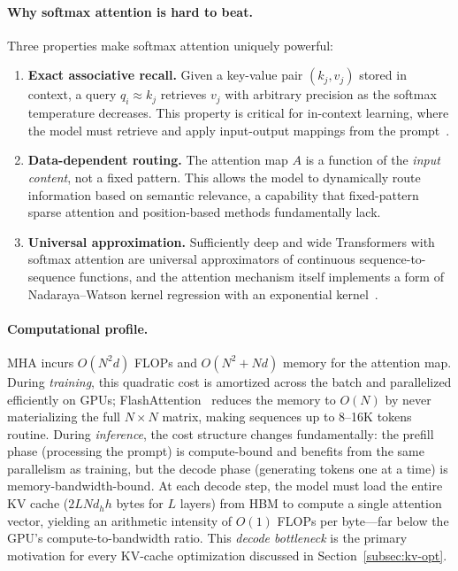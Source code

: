 \documentclass[11pt,a4paper]{article}
\begin{document}
\paragraph{Why softmax attention is hard to beat.}
Three properties make softmax attention uniquely powerful:
\begin{enumerate}
\item \textbf{Exact associative recall.} Given a key-value pair $(k_j, v_j)$ stored in context, a query $q_i \approx k_j$ retrieves $v_j$ with arbitrary precision as the softmax temperature decreases. This property is critical for in-context learning, where the model must retrieve and apply input-output mappings from the prompt~\cite{olsson2022context}.
\item \textbf{Data-dependent routing.} The attention map $A$ is a function of the \emph{input content}, not a fixed pattern. This allows the model to dynamically route information based on semantic relevance, a capability that fixed-pattern sparse attention and position-based methods fundamentally lack.
\item \textbf{Universal approximation.} Sufficiently deep and wide Transformers with softmax attention are universal approximators of continuous sequence-to-sequence functions, and the attention mechanism itself implements a form of Nadaraya--Watson kernel regression with an exponential kernel~\cite{tay2020efficient}.
\end{enumerate}

\paragraph{Computational profile.}
MHA incurs $O(N^2 d)$ FLOPs and $O(N^2 + Nd)$ memory for the attention map. During \emph{training}, this quadratic cost is amortized across the batch and parallelized efficiently on GPUs; FlashAttention~\cite{dao2022flashattention} reduces the memory to $O(N)$ by never materializing the full $N \times N$ matrix, making sequences up to 8--16K tokens routine. During \emph{inference}, the cost structure changes fundamentally: the prefill phase (processing the prompt) is compute-bound and benefits from the same parallelism as training, but the decode phase (generating tokens one at a time) is memory-bandwidth-bound. At each decode step, the model must load the entire KV cache ($2LNd_h h$ bytes for $L$ layers) from HBM to compute a single attention vector, yielding an arithmetic intensity of $O(1)$ FLOPs per byte---far below the GPU's compute-to-bandwidth ratio. This \emph{decode bottleneck} is the primary motivation for every KV-cache optimization discussed in Section~\ref{subsec:kv-opt}.
\end{document}
